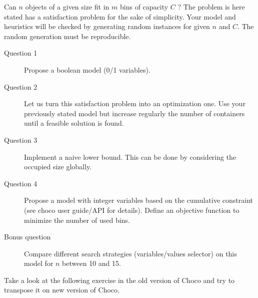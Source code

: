Can $n$ objects of a given size fit in $m$ bins of capacity $C$ ? The problem is here stated has a satisfaction problem for the sake of simplicity. Your model and heuristics will be checked by generating random instances for given $n$ and $C$. The random generation must be reproducible.
\begin{description}
	\item[Question 1] Propose a boolean model (0/1 variables).
	\item[Question 2] Let us turn this satisfaction problem into an optimization one. Use your previously stated model but increase regularly the number of containers until a feasible solution is found.
	\item[Question 3] Implement a naive lower bound. This can be done by considering the occupied size globally.
	\item[Question 4] Propose a model with integer variables based on the cumulative constraint (see choco user guide/API for details). Define an objective function to minimize the number of used bins.
	\item[Bonus question] Compare different search strategies (variables/values selector) on this model for $n$ between 10 and 15.
\end{description}

Take a look at the following exercise in the old version of Choco and try to transpose it on new version of Choco.

